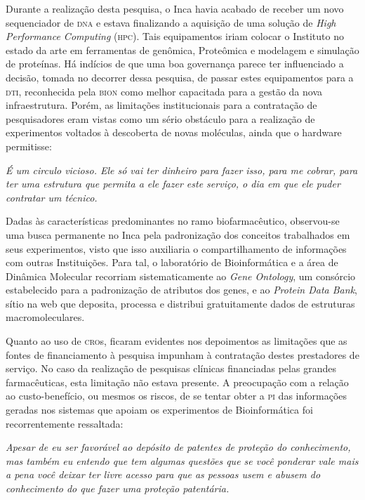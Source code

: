 \documentclass{article}
\begin{document}
Durante a realização desta pesquisa, o Inca havia acabado de receber um novo
sequenciador de \textsc{dna} e estava finalizando a aquisição de uma solução de
\textit{High Performance Computing}
(\textsc{hpc}). Tais equipamentos iriam colocar o Instituto no estado da arte em
ferramentas de genômica, Proteômica e modelagem e simulação de proteínas. Há
indícios de que uma boa governança parece ter influenciado a decisão, tomada no
decorrer dessa pesquisa, de passar estes equipamentos para a \textsc{dti}, reconhecida
pela \textsc{bion} como melhor capacitada para a gestão da nova infraestrutura. Porém, as
limitações institucionais para a contratação de pesquisadores eram vistas como
um sério obstáculo para a realização de experimentos voltados à descoberta de
novas moléculas, ainda que o hardware permitisse:

\textit{É um circulo vicioso. Ele só vai ter dinheiro para fazer isso, para me
cobrar, para ter uma estrutura que permita a ele fazer este serviço, o dia em
que ele puder contratar um técnico.}

Dadas às características predominantes no ramo biofarmacêutico, observou-se uma
busca permanente no Inca pela padronização dos conceitos trabalhados em seus
experimentos, visto que isso auxiliaria o compartilhamento de informações com
outras Instituições. Para tal, o laboratório de Bioinformática e a área de
Dinâmica Molecular recorriam sistematicamente ao \textit{Gene Ontology}, um consórcio estabelecido para a padronização de atributos dos genes, e ao
\textit{Protein Data Bank}, sítio na web que deposita, processa e distribui gratuitamente dados de
estruturas macromoleculares.

Quanto ao uso de \textsc{cro}s, ficaram evidentes nos depoimentos as limitações que as
fontes de financiamento à pesquisa impunham à contratação destes prestadores de
serviço. No caso da realização de pesquisas clínicas financiadas pelas grandes
farmacêuticas, esta limitação não estava presente. A preocupação com a relação
ao custo-benefício, ou mesmos os riscos, de se tentar obter a \textsc{pi} das informações
geradas nos sistemas que apoiam os experimentos de Bioinformática foi
recorrentemente ressaltada:

\textit{Apesar de eu ser favorável ao depósito de patentes de proteção do
conhecimento, mas também eu entendo que tem algumas questões que se você
ponderar vale mais a pena você deixar ter livre acesso para que as pessoas usem
e abusem do conhecimento do que fazer uma proteção patentária.}
\end{document}
